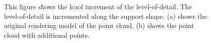 \begin{figure}
\centering
{}
\caption[Example of the local increment of level-of-detail]
{This figure shows the lcaol increment of the level-of-detail. The level-of-detail is incremented along the support shape. (a) shows the original rendering model of the point cloud, (b) shows the point cloud with additional points. }
\label{fig:technologiezentrum_lod_increment}
\end{figure}



